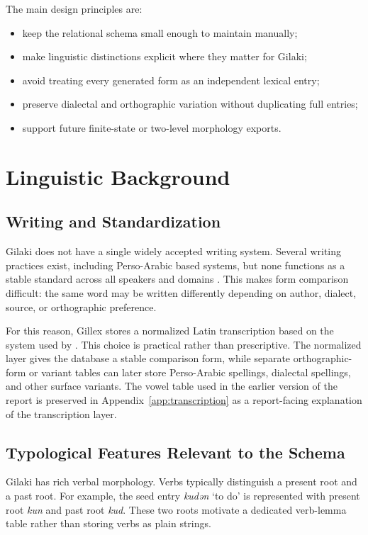 \documentclass[11pt]{article}
\newcommand{\gil}[1]{\textit{#1}}
\begin{document}
The main design principles are:
\begin{itemize}[leftmargin=*]
    \item keep the relational schema small enough to maintain manually;
    \item make linguistic distinctions explicit where they matter for Gilaki;
    \item avoid treating every generated form as an independent lexical entry;
    \item preserve dialectal and orthographic variation without duplicating full entries;
    \item support future finite-state or two-level morphology exports.
\end{itemize}

\section{Linguistic Background}

\subsection{Writing and Standardization}

Gilaki does not have a single widely accepted writing system. Several writing practices exist, including Perso-Arabic based systems, but none functions as a stable standard across all speakers and domains \cite{rastorgueva2012gilaki}. This makes form comparison difficult: the same word may be written differently depending on author, dialect, source, or orthographic preference.

For this reason, Gillex stores a normalized Latin transcription based on the system used by \citet{rastorgueva2012gilaki}. This choice is practical rather than prescriptive. The normalized layer gives the database a stable comparison form, while separate orthographic-form or variant tables can later store Perso-Arabic spellings, dialectal spellings, and other surface variants. The vowel table used in the earlier version of the report is preserved in Appendix~\ref{app:transcription} as a report-facing explanation of the transcription layer.

\subsection{Typological Features Relevant to the Schema}

Gilaki has rich verbal morphology. Verbs typically distinguish a present root and a past root. For example, the seed entry \gil{kudǝn} `to do' is represented with present root \gil{kun} and past root \gil{kud}. These two roots motivate a dedicated verb-lemma table rather than storing verbs as plain strings.
\end{document}
